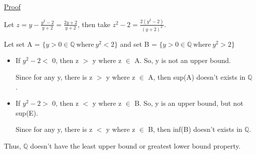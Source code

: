 {\color{magenta} \underline{Proof}}

	Let $ z = y - \frac{y^2-2}{y+2} = \frac{2y+2}{y+2} $,
	then take $ z^2-2 = \frac{2(y^2-2)}{(y+2)^2} $.

	Let set A = $ \{ y > 0 \in \mathbb{Q} \ \text{where} \ y^2 < 2 \} $ and
	set B = $ \{ y > 0 \in \mathbb{Q} \ \text{where} \ y^2 > 2 \} $

	\begin{itemize}[leftmargin=1cm, itemsep=0.1cm]
		\item If $ y^2-2 < $ 0, then z $>$ y where z $\in$ A.
			So, y is not an upper bound.

			Since for any y, there is z $>$ y where z $\in$ A, then sup(A) doesn't
			exists in $\mathbb{Q}$.
	
		\item If $ y^2-2 > $ 0, then z $<$ y where z $\in$ B.
			So, y is an upper bound, but not sup(E).

			Since for any y, there is z $<$ y where z $\in$ B, then inf(B) doesn't
			exists in $\mathbb{Q}$.
	\end{itemize}

	Thus, $\mathbb{Q}$ doesn't have the least upper bound or greatest lower bound property.


